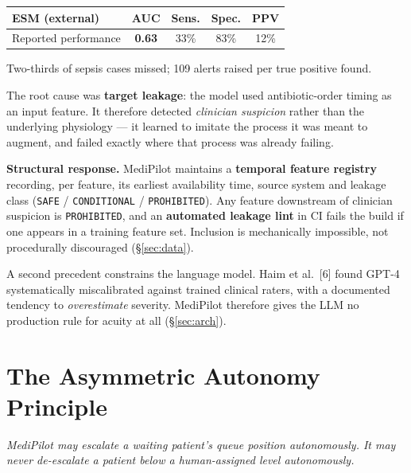 \documentclass[10pt,a4paper,twocolumn]{article}
\begin{document}
\begin{center}\footnotesize\sffamily
\begin{tabular}{@{}lcccc@{}}
\toprule
\rowcolor{AccPurple!10}
\textbf{ESM (external)} & AUC & Sens. & Spec. & PPV\\
\midrule
Reported performance & \textcolor{AccPurple}{\bfseries 0.63} & 33\% & 83\% & 12\%\\
\bottomrule
\end{tabular}
\end{center}
\vspace{-2pt}
{\footnotesize\color{MedGray}Two-thirds of sepsis cases missed; 109 alerts raised per
true positive found.}

\vspace{4pt}
The root cause was \textbf{target leakage}: the model used antibiotic-order timing as
an input feature. It therefore detected \emph{clinician suspicion} rather than the
underlying physiology --- it learned to imitate the process it was meant to augment,
and failed exactly where that process was already failing.

\begin{tcolorbox}[mpbox]
\textbf{Structural response.} MediPilot maintains a \textbf{temporal feature
registry} recording, per feature, its earliest availability time, source system and
leakage class (\texttt{SAFE} / \texttt{CONDITIONAL} / \texttt{PROHIBITED}). Any
feature downstream of clinician suspicion is \texttt{PROHIBITED}, and an
\textbf{automated leakage lint} in CI fails the build if one appears in a training
feature set. Inclusion is mechanically impossible, not procedurally discouraged
(\S\ref{sec:data}).
\end{tcolorbox}

A second precedent constrains the language model. Haim et al.\ [6] found
GPT-4 systematically miscalibrated against trained clinical raters, with a documented
tendency to \emph{overestimate} severity. MediPilot therefore gives the LLM no
production rule for acuity at all (\S\ref{sec:arch}).

\section{The Asymmetric Autonomy Principle}
\label{sec:principle}

\begin{tcolorbox}[mpthesis]
\itshape MediPilot may escalate a waiting patient's queue position autonomously.
It may never de-escalate a patient below a human-assigned level autonomously.
\end{tcolorbox}
\end{document}
